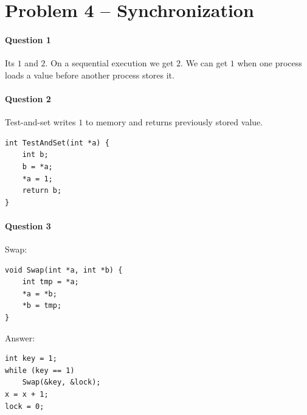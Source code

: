 \section{Problem 4 –  Synchronization}

\paragraph{Question 1}
Its $1$ and $2$.
On a sequential execution we get $2$.
We can get $1$ when one process loads a value before another process stores it.

\paragraph{Question 2}
Test-and-set writes $1$ to memory and returns previously stored value.

\begin{verbatim}
int TestAndSet(int *a) {
    int b;
    b = *a;
    *a = 1;
    return b;
}
\end{verbatim}


\paragraph{Question 3}
Swap:
\begin{verbatim}
void Swap(int *a, int *b) {
    int tmp = *a;
    *a = *b;
    *b = tmp;
}
\end{verbatim}
Answer:
\begin{verbatim}
int key = 1;
while (key == 1)
    Swap(&key, &lock);
x = x + 1;
lock = 0;
\end{verbatim}

